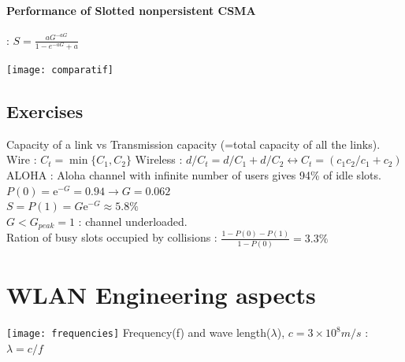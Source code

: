 \documentclass[6pt]{scrartcl}
\begin{document}
\begin{multicols}{4}
\paragraph{Performance of Slotted nonpersistent CSMA}:
$S = \frac{aG^{-aG}}{1-e^{-aG} + a}$

\texttt{[image: comparatif]}

\subsection{Exercises}
Capacity of a link vs Transmission capacity (=total capacity of all the links). Wire : $C_t=\min \{C_1, C_2\}$ Wireless : $d/C_t = d/C_1+d/C_2 \leftrightarrow C_t = (c_1 c_2/c_1+c_2)$\\
ALOHA : Aloha channel with infinite number of users gives 94\% of idle slots. $P(0) = \mathrm{e}^{-G}=0.94 \rightarrow G=0.062$ \\ $S=P(1)=G\mathrm{e}^{-G}\approx 5.8\%$ \\ $G<G_{peak} = 1$ : channel underloaded. \\ Ration of busy slots occupied by collisions : $\frac{1-P(0)-P(1)}{1-P(0)}=3.3\%$

\section{WLAN Engineering aspects}
\texttt{[image: frequencies]}
Frequency(f) and wave length($\lambda$), $c=3 \times 10^8 m/s$  : $\lambda = c/f$

\end{multicols}
\end{document}
